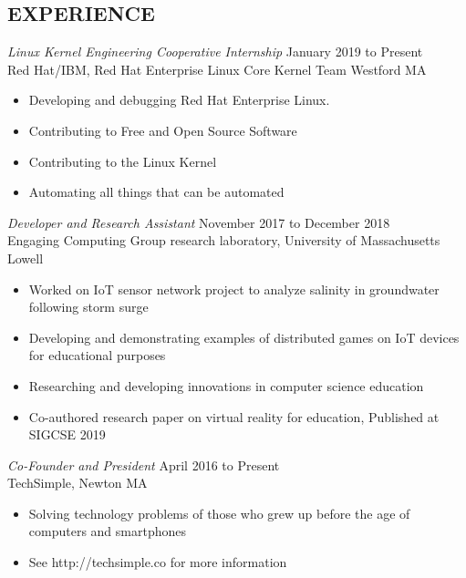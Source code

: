 \documentclass[margin]{res}
\begin{document}
\begin{resume}
\section{EXPERIENCE} {\sl Linux Kernel Engineering Cooperative Internship} \hfill January 2019 to Present\\
                Red Hat/IBM, 
                Red Hat Enterprise Linux Core Kernel Team Westford MA
                 \begin{itemize}  \itemsep -2pt %
                 \item Developing and debugging Red Hat Enterprise Linux. 
                \item   Contributing to Free and Open Source Software
                \item Contributing to the Linux Kernel
                \item Automating all things that can be automated
                \end{itemize}
 
                {\sl Developer and Research Assistant} \hfill            November 2017 to December 2018 \\
                Engaging Computing Group research laboratory, University of Massachusetts Lowell
                 \begin{itemize}  \itemsep -2pt %
                 \item Worked on IoT sensor network project to analyze salinity in groundwater following storm surge
                 \item Developing and demonstrating examples of distributed games on IoT devices for educational purposes
				  \item Researching and developing innovations in computer science education
				  \item Co-authored research paper on virtual reality for education, Published at SIGCSE 2019
                 \end{itemize} 
                {\sl Co-Founder and President} \hfill        April 2016 to Present \\
                TechSimple, Newton MA
                  \begin{itemize}   \itemsep -2pt %
                   \item Solving technology problems of those who grew up before the age of computers and smartphones
                   \item See http://techsimple.co for more information
                   \end{itemize} 


\end{resume}
\end{document}
